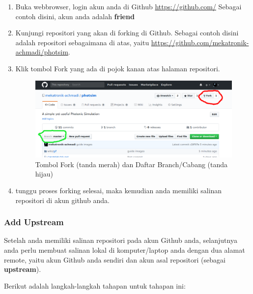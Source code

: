 \documentclass[12pt]{article}
\begin{document}
	\begin{enumerate}
		\item Buka webbrowser, login akun anda di Github \url{https://github.com/}
		Sebagai contoh disini, akun anda adalah \textbf{friend}
		\item Kunjungi repositori yang akan di forking di Github.
		Sebagai contoh disini adalah repositori sebagaimana di atas, yaitu \url{https://github.com/mekatronik-achmadi/photsim}.
		\item Klik tombol Fork yang ada di pojok kanan atas halaman repositori.
		 
		\begin{figure}[h!]
			\centering
			\captionsetup{justification=centering}
			\includegraphics[width=0.8\linewidth]{../images/png/fork_branch}
			\caption[Tombol Fork dan Branch]{\small{Tombol Fork (tanda merah) dan Daftar Branch/Cabang (tanda hijau)}}
		\end{figure}
	
		\item tunggu proses forking selesai, maka kemudian anda memiliki salinan repositori di akun github anda.
	 
	\end{enumerate}
	
	\subsubsection{Add Upstream}
	
	Setelah anda memiliki salinan repositori pada akun Github anda,
	selanjutnya anda perlu membuat salinan lokal di komputer/laptop anda dengan dua alamat remote,
	yaitu akun Github anda sendiri dan akun asal repositori (sebagai \textbf{upstream}).
	
	Berikut adalah langkah-langkah tahapan untuk tahapan ini:
	
\end{document}
